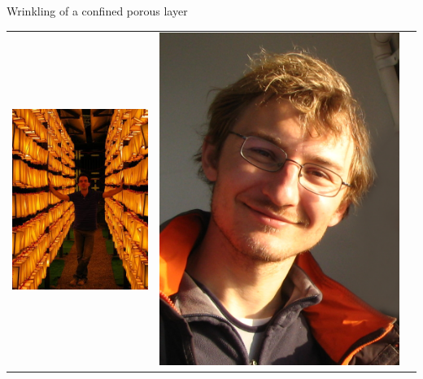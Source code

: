 \begin{frame}{Wrinkling of a confined porous layer}

\bigskip
{}

\bigskip
\begin{tabu}{X[c]X[c]c}
\includegraphics[height=0.3\textheight,clip=true,trim=3cm 7cm  2cm 5cm]{Mathieu}&
\includegraphics[height=0.3\textheight]{Thomas}&

\end{tabu}
\end{frame}
